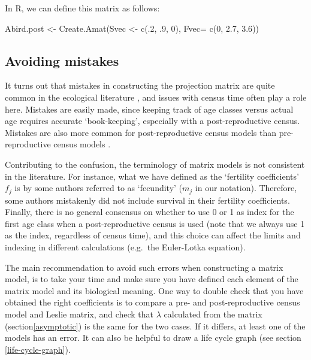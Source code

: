 \documentclass[
]{book}
\newenvironment{Shaded}{\begin{snugshade}}{\end{snugshade}}
\newcommand{\AttributeTok}[1]{\textcolor[rgb]{0.77,0.63,0.00}{#1}}
\newcommand{\DecValTok}[1]{\textcolor[rgb]{0.00,0.00,0.81}{#1}}
\newcommand{\FloatTok}[1]{\textcolor[rgb]{0.00,0.00,0.81}{#1}}
\newcommand{\FunctionTok}[1]{\textcolor[rgb]{0.00,0.00,0.00}{#1}}
\newcommand{\NormalTok}[1]{#1}
\newcommand{\OtherTok}[1]{\textcolor[rgb]{0.56,0.35,0.01}{#1}}
\begin{document}
In R, we can define this matrix as follows:

\begin{Shaded}
\begin{Highlighting}[]
\NormalTok{Abird.post }\OtherTok{\textless{}{-}} \FunctionTok{Create.Amat}\NormalTok{(Svec }\OtherTok{\textless{}{-}} \FunctionTok{c}\NormalTok{(.}\DecValTok{2}\NormalTok{, .}\DecValTok{9}\NormalTok{, }\DecValTok{0}\NormalTok{), }\AttributeTok{Fvec=} \FunctionTok{c}\NormalTok{(}\DecValTok{0}\NormalTok{, }\FloatTok{2.7}\NormalTok{, }\FloatTok{3.6}\NormalTok{))  }
\end{Highlighting}
\end{Shaded}

\hypertarget{avoiding-mistakes}{%
\subsection{Avoiding mistakes}\label{avoiding-mistakes}}

It turns out that mistakes in constructing the projection matrix are quite common in the ecological literature \citep{Kendall8}, and issues with census time often play a role here. Mistakes are easily made, since keeping track of age classes versus actual age requires accurate `book-keeping', especially with a post-reproductive census. Mistakes are also more common for post-reproductive census models than pre-reproductive census models \citep{Kendall8}.

Contributing to the confusion, the terminology of matrix models is not consistent in the literature. For instance, what we have defined as the `fertility coefficients' \(f_j\) is by some authors referred to as `fecundity' (\(m_j\) in our notation). Therefore, some authors mistakenly did not include survival in their fertility coefficients. Finally, there is no general consensus on whether to use 0 or 1 as index for the first age class when a post-reproductive census is used (note that we always use 1 as the index, regardless of census time), and this choice can affect the limits and indexing in different calculations (e.g.~the Euler-Lotka equation).

The main recommendation to avoid such errors when constructing a matrix model, is to take your time and make sure you have defined each element of the matrix model and its biological meaning. One way to double check that you have obtained the right coefficients is to compare a pre- and post-reproductive census model and Leslie matrix, and check that \(\lambda\) calculated from the matrix (section\ref{asymptotic}) is the same for the two cases. If it differs, at least one of the models has an error. It can also be helpful to draw a life cycle graph (see section \ref{life-cycle-graph}).
\end{document}
